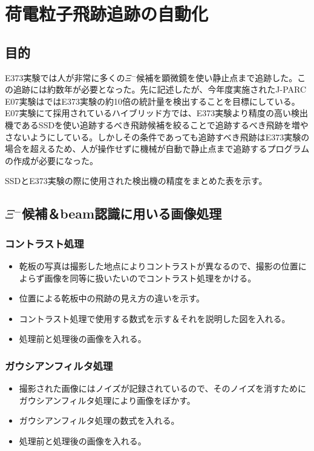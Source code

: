 \documentclass[12pt,a4paper]{jarticle}
\begin{document}
\newpage
\section{荷電粒子飛跡追跡の自動化}
\subsection{目的}
E373実験では人が非常に多くの$\Xi$$^-$候補を顕微鏡を使い静止点まで追跡した。この追跡には約数年が必要となった。先に記述したが、今年度実施されたJ-PARC E07実験はではE373実験の約10倍の統計量を検出することを目標にしている。E07実験にて採用されているハイブリッド方では、E373実験より精度の高い検出機であるSSDを使い追跡するべき飛跡候補を絞ることで追跡するべき飛跡を増やさないようにしている。しかしその条件であっても追跡すべき飛跡はE373実験の場合を超えるため、人が操作せずに機械が自動で静止点まで追跡するプログラムの作成が必要になった。\par
SSDとE373実験の際に使用された検出機の精度をまとめた表を示す。
\subsection{$\Xi$$^-$候補＆beam認識に用いる画像処理}
\subsubsection{コントラスト処理}
\begin{itemize}
    \item 乾板の写真は撮影した地点によりコントラストが異なるので、撮影の位置によらず画像を同等に扱いたいのでコントラスト処理をかける。
    \item 位置による乾板中の飛跡の見え方の違いを示す。
    \item コントラスト処理で使用する数式を示す＆それを説明した図を入れる。
    \item 処理前と処理後の画像を入れる。
\end{itemize}
\subsubsection{ガウシアンフィルタ処理}
\begin{itemize}
    \item 撮影された画像にはノイズが記録されているので、そのノイズを消すためにガウシアンフィルタ処理により画像をぼかす。
    \item ガウシアンフィルタ処理の数式を入れる。
    \item 処理前と処理後の画像を入れる。
\end{itemize}
\end{document}
